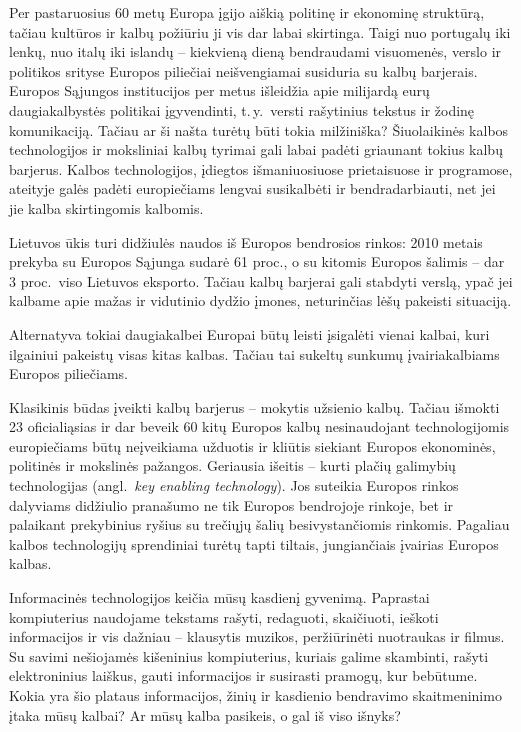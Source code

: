 \begin{multicols}{2}
Per pastaruosius 60 metų Europa įgijo aiškią politinę ir ekonominę struktūrą, tačiau kultūros ir kalbų požiūriu ji vis dar labai skirtinga. Taigi nuo portugalų iki lenkų, nuo italų iki islandų – kiekvieną dieną bendraudami visuomenės, verslo ir politikos srityse Europos piliečiai neišvengiamai susiduria su kalbų barjerais. Europos Sąjungos institucijos per metus išleidžia apie milijardą eurų daugiakalbystės politikai įgyvendinti, t.\,y.~versti rašytinius tekstus ir žodinę komunikaciją. Tačiau ar ši našta turėtų būti tokia milžiniška? Šiuolaikinės kalbos technologijos ir moksliniai kalbų tyrimai gali labai padėti griaunant tokius kalbų barjerus. Kalbos technologijos, įdiegtos išmaniuosiuose prietaisuose ir programose, ateityje galės padėti europiečiams lengvai susikalbėti ir bendradarbiauti, net jei jie kalba skirtingomis kalbomis.

Lietuvos ūkis turi didžiulės naudos iš Europos bendrosios rinkos: 2010 metais prekyba su Europos Sąjunga sudarė 61 proc., o su kitomis Europos šalimis – dar 3 proc.~viso Lietuvos eksporto. Tačiau kalbų barjerai gali stabdyti verslą, ypač jei kalbame apie mažas ir vidutinio dydžio įmones, neturinčias lėšų pakeisti situaciją. 

Alternatyva tokiai daugiakalbei Europai būtų leisti įsigalėti vienai kalbai, kuri ilgainiui pakeistų visas kitas kalbas. Tačiau tai sukeltų sunkumų įvairiakalbiams Europos piliečiams. 

Klasikinis būdas įveikti kalbų barjerus – mokytis užsienio kalbų. Tačiau išmokti 23 oficialiąsias ir dar beveik 60 kitų Europos kalbų nesinaudojant technologijomis europiečiams būtų neįveikiama užduotis ir kliūtis siekiant Europos ekonominės, politinės ir mokslinės pažangos.
Geriausia išeitis – kurti plačių galimybių technologijas (angl.~\textit{key enabling technology}). Jos suteikia Europos rinkos dalyviams didžiulio pranašumo ne tik Europos bendrojoje rinkoje, bet ir palaikant prekybinius ryšius su trečiųjų šalių besivystančiomis rinkomis. Pagaliau kalbos technologijų sprendiniai turėtų tapti tiltais, jungiančiais įvairias Europos kalbas. 


Informacinės technologijos keičia mūsų kasdienį gyvenimą. Paprastai kompiuterius naudojame tekstams rašyti, redaguoti, skaičiuoti, ieškoti informacijos ir vis dažniau – klausytis muzikos, peržiūrinėti nuotraukas ir filmus. Su savimi nešiojamės kišeninius kompiuterius, kuriais galime skambinti, rašyti elektroninius laiškus, gauti informacijos ir susirasti pramogų, kur bebūtume. Kokia yra šio plataus informacijos, žinių ir kasdienio bendravimo skaitmeninimo įtaka mūsų kalbai? Ar mūsų kalba pasikeis, o gal iš viso išnyks? 


\end{multicols}
